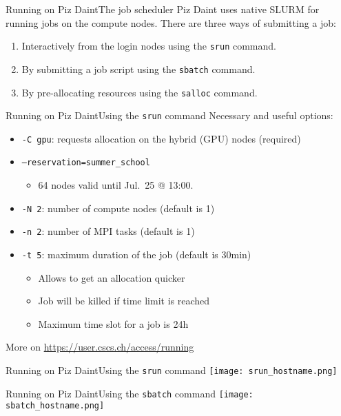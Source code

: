 \begin{frame}{Running on Piz Daint}{The job scheduler}
  Piz Daint uses native SLURM for running jobs on the compute nodes.
  There are three ways of submitting a job:
  \vspace\baselineskip
  \begin{enumerate}
  \item Interactively from the login nodes using the \texttt{srun} command.
  \item By submitting a job script using the \texttt{sbatch} command.
  \item By pre-allocating resources using the \texttt{salloc} command.
  \end{enumerate}
\end{frame}

\begin{frame}[fragile]{Running on Piz Daint}{Using the \texttt{srun} command}
  Necessary and useful options:
  \begin{itemize}
  \item \texttt{-C gpu}: requests allocation on the hybrid (GPU) nodes (required)
  \item \texttt{--reservation=summer\_school}
    \begin{itemize}
    \item 64 nodes valid until Jul.\ 25 @ 13:00.
    \end{itemize}
  \item \texttt{-N 2}: number of compute nodes (default is 1)
  \item \texttt{-n 2}: number of MPI tasks (default is 1)
  \item \texttt{-t 5}: maximum duration of the job (default is 30min)
    \begin{itemize}
    \item Allows to get an allocation quicker
    \item Job will be killed if time limit is reached
    \item Maximum time slot for a job is 24h
    \end{itemize}
  \end{itemize}
  More on \url{https://user.cscs.ch/access/running}
\end{frame}

\begin{frame}[fragile]{Running on Piz Daint}{Using the \texttt{srun} command}
  {
    \centering
    \texttt{[image: srun\_hostname.png]}
  }
\end{frame}

\begin{frame}[fragile]{Running on Piz Daint}{Using the \texttt{sbatch} command}
  {
    \centering
    \texttt{[image: sbatch\_hostname.png]}
  }
\end{frame}


